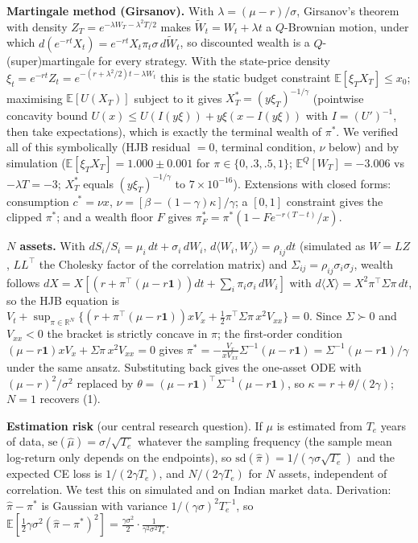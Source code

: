 \documentclass[10pt,a4paper]{article}
\newcommand{\E}{\mathbb E}
\begin{document}
\textbf{Martingale method (Girsanov).} With $\lambda=(\mu-r)/\sigma$, Girsanov's theorem with density $Z_T=e^{-\lambda W_T-\lambda^2T/2}$ makes $\widetilde W_t=W_t+\lambda t$ a $Q$-Brownian motion, under which $d(e^{-rt}X_t)=e^{-rt}X_t\pi_t\sigma\,d\widetilde W_t$, so discounted wealth is a $Q$-(super)martingale for every strategy. With the state-price density \cite{kls,ks} $\xi_t=e^{-rt}Z_t=e^{-(r+\lambda^2/2)t-\lambda W_t}$ this is the static budget constraint $\E[\xi_TX_T]\le x_0$; maximising $\E[U(X_T)]$ subject to it gives $X_T^*=(y\xi_T)^{-1/\gamma}$ (pointwise concavity bound $U(x)\le U(I(y\xi))+y\xi(x-I(y\xi))$ with $I=(U')^{-1}$, then take expectations), which is exactly the terminal wealth of $\pi^*$. We verified all of this symbolically (HJB residual $=0$, terminal condition, $\nu$ below) and by simulation ($\E[\xi_TX_T]=1.000\pm0.001$ for $\pi\in\{0,.3,.5,1\}$; $\E^Q[W_T]=-3.006$ vs $-\lambda T=-3$; $X^*_T$ equals $(y\xi_T)^{-1/\gamma}$ to $7\!\times\!10^{-16}$). Extensions with closed forms: consumption $c^*=\nu x$, $\nu=[\beta-(1-\gamma)\kappa]/\gamma$; a $[0,1]$ constraint gives the clipped $\pi^*$; and a wealth floor $F$ gives $\pi^*_F=\pi^*(1-Fe^{-r(T-t)}/x)$.

\textbf{$N$ assets.} With $dS_i/S_i=\mu_i\,dt+\sigma_i\,dW_i$, $d\langle W_i,W_j\rangle=\rho_{ij}dt$ (simulated as $W=LZ$, $LL^{\!\top}$ the Cholesky factor of the correlation matrix) and $\Sigma_{ij}=\rho_{ij}\sigma_i\sigma_j$, wealth follows $dX=X[(r+\pi^{\!\top}(\mu-r\mathbf 1))dt+\sum_i\pi_i\sigma_i\,dW_i]$ with $d\langle X\rangle=X^2\pi^{\!\top}\Sigma\pi\,dt$, so the HJB equation is $V_t+\sup_{\pi\in\mathbb R^N}\{(r+\pi^{\!\top}(\mu-r\mathbf 1))xV_x+\tfrac12\pi^{\!\top}\Sigma\pi\,x^2V_{xx}\}=0$. Since $\Sigma\succ0$ and $V_{xx}<0$ the bracket is strictly concave in $\pi$; the first-order condition $(\mu-r\mathbf 1)xV_x+\Sigma\pi\,x^2V_{xx}=0$ gives $\pi^*=-\frac{V_x}{xV_{xx}}\Sigma^{-1}(\mu-r\mathbf 1)=\Sigma^{-1}(\mu-r\mathbf 1)/\gamma$ under the same ansatz. Substituting back gives the one-asset ODE with $(\mu-r)^2/\sigma^2$ replaced by $\theta=(\mu-r\mathbf 1)^{\!\top}\Sigma^{-1}(\mu-r\mathbf 1)$, so $\kappa=r+\theta/(2\gamma)$; $N=1$ recovers (1).

\textbf{Estimation risk} (our central research question). If $\mu$ is estimated from $T_e$ years of data, $\mathrm{se}(\hat\mu)=\sigma/\sqrt{T_e}$ whatever the sampling frequency \cite{merton80} (the sample mean log-return only depends on the endpoints), so $\mathrm{sd}(\hat\pi)=1/(\gamma\sigma\sqrt{T_e})$ and the expected CE loss is $1/(2\gamma T_e)$, and $N/(2\gamma T_e)$ for $N$ assets, independent of correlation. We test this on simulated and on Indian market data. Derivation: $\hat\pi-\pi^*$ is Gaussian with variance $1/(\gamma\sigma)^2T_e^{-1}$, so $\E[\tfrac12\gamma\sigma^2(\hat\pi-\pi^*)^2]=\tfrac{\gamma\sigma^2}{2}\cdot\tfrac1{\gamma^2\sigma^2T_e}$.
\end{document}
